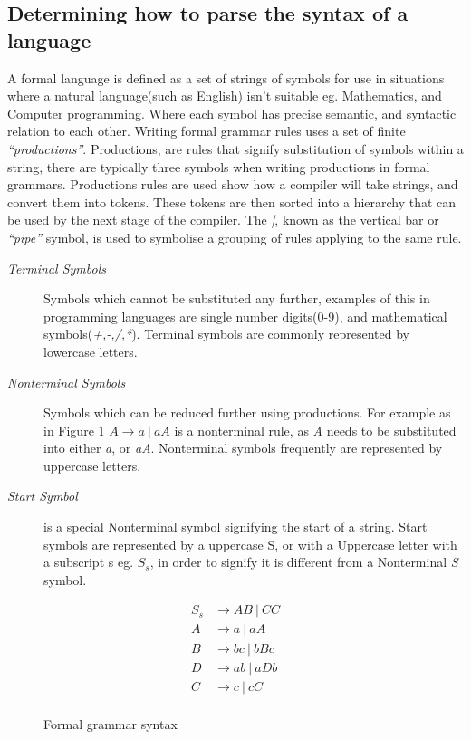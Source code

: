 \subsection{Determining how to parse the syntax of a language}
A formal language is defined as a set of strings of symbols for use in situations where a natural language(such as English) isn't suitable eg. Mathematics, and Computer programming. Where each symbol has precise semantic, and syntactic relation to each other. Writing formal grammar rules uses a set of finite \textit{``productions''}. Productions, are rules that signify substitution of symbols within a string, there are typically three symbols when writing productions in formal grammars. Productions rules are used show how a compiler will take strings, and convert them into tokens. These tokens are then sorted into a hierarchy that can be used by the next stage of the compiler. The \textit{|}, known as the vertical bar or \textit{``pipe''} symbol, is used to symbolise a grouping of rules applying to the same rule.
\begin{description}
    \item[\textit{Terminal Symbols}] Symbols which cannot be substituted any further, examples of this in programming languages are single number digits(0-9), and mathematical symbols(\textit{+,-,/,*}). Terminal symbols are commonly represented by lowercase letters.
    
    \item[\textit{Nonterminal Symbols}] Symbols which can be reduced further using productions. For example as in Figure \ref{fig:grammar} $A \rightarrow a\ |\ aA$ is a nonterminal rule, as \textit{A} needs to be substituted into either \textit{a}, or \textit{aA}. Nonterminal symbols frequently are represented by uppercase letters.

    \item[\textit{Start Symbol}] is a special Nonterminal symbol signifying the start of a string. Start symbols are represented by a uppercase S, or with a Uppercase letter with a subscript s eg. $S_s$, in order to signify it is different from a Nonterminal \textit{S} symbol.
\end{description}

\begin{figure}[!hbtp]
    \begin{align*}
        S_s &\rightarrow AB\ |\ CC \\
        A &\rightarrow a\ |\ aA \\
        B &\rightarrow bc\ |\ bBc \\
        D &\rightarrow ab\ |\ aDb \\
        C &\rightarrow c\ |\ cC \\
    \end{align*}
    \caption{Formal grammar syntax\cite{ParseTech}}
    \label{fig:grammar}
\end{figure}

